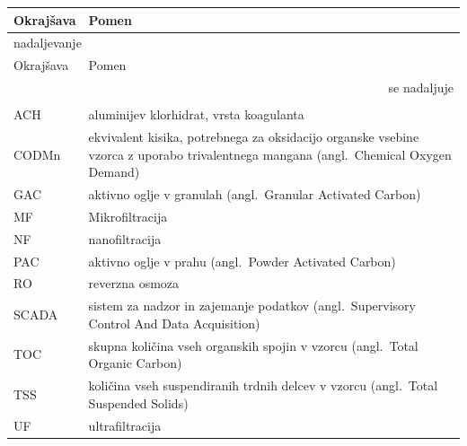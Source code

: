 \begin{longtable}[l]{@{}p{34mm}p{\dimexpr\textwidth-34mm-2\tabcolsep\relax}@{}}
\toprule
Okrajšava & Pomen\\ \midrule
\endfirsthead
\multicolumn{2}{l}{nadaljevanje}\\
\toprule Okrajšava & Pomen\\ \midrule
\endhead
\multicolumn{2}{r}{se nadaljuje}\\
\endfoot
\endlastfoot
\multicolumn{2}{@{}l}{~}\\
ACH & aluminijev klorhidrat, vrsta koagulanta\\
CODMn & ekvivalent kisika, potrebnega za oksidacijo organske vsebine vzorca z uporabo trivalentnega mangana (angl.~Chemical Oxygen Demand)\\
GAC & aktivno oglje v granulah (angl.~Granular Activated Carbon)\\
MF & Mikrofiltracija\\
NF & nanofiltracija\\
PAC & aktivno oglje v prahu (angl.~Powder Activated Carbon)\\
RO & reverzna osmoza\\
SCADA & sistem za nadzor in zajemanje podatkov (angl.~Supervisory Control And Data Acquisition)\\
TOC & skupna količina vseh organskih spojin v vzorcu (angl.~Total Organic Carbon)\\
TSS & količina vseh suspendiranih trdnih delcev v vzorcu (angl.~Total Suspended Solids)\\
UF & ultrafiltracija\\
\end{longtable}
\setlength{\LTpre}{\bigskipamount}
